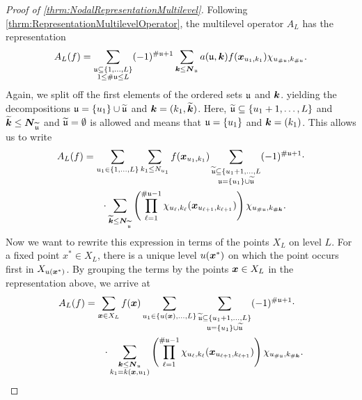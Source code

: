 \documentclass[	a4paper, 
								11pt]{article}
\theoremstyle{plain}
\begin{document}
\begin{proof}[Proof of \cref{thrm:NodalRepresentationMultilevel}]
Following \cref{thrm:RepresentationMultilevelOperator}, the multilevel operator $A_L$ has the representation
\begin{align*}
A_L(f) = \sum_{\substack{\mathfrak{u} \subseteq \{1, \dots, L \} \\ 1 \leq \# \mathfrak{u} \leq L}} (-1)^{\# \mathfrak{u} + 1} \sum_{\boldsymbol{k} \leq \boldsymbol{N}_{\mathfrak{u}}} a(\mathfrak{u}, \boldsymbol{k}) f(\boldsymbol{x}_{u_1,k_1}) \chi_{u_{\# \mathfrak{u}}, k_{\# \mathfrak{u}}}.
\end{align*}
Again, we split off the first elements of the ordered sets $ \mathfrak{u} $ and $ \boldsymbol{k} $. yielding the decompositions $ \mathfrak{u} = \{ u_1 \} \cup \widetilde{\mathfrak{u}} $ and $ \boldsymbol{k} = (k_1, \widetilde{\boldsymbol{k}} ) $. Here, $ \widetilde{\mathfrak{u}} \subseteq \{ u_1 + 1, \dots, L \} $ and $ \widetilde{\boldsymbol{k}} \leq \boldsymbol{N}_{\widetilde{\mathfrak{u}}} $ and $ \widetilde{\mathfrak{u}} = \emptyset $ is allowed and means that $ \mathfrak{u} = \{ u_1 \} $ and $ \boldsymbol{k} = (k_1) $. This allows us to write
\begin{align*}
    A_L(f) &= \sum_{u_1 \in \{ 1, \dots, L\}} \sum_{k_1 \leq N_{u_1}} f(\boldsymbol{x}_{u_1,k_1}) \sum_{\substack{\widetilde{\mathfrak{u}} \subseteq \{ u_1 + 1, \dots, L \\ \mathfrak{u} = \{ u_1 \} \cup \widetilde{\mathfrak{u}} }} (-1)^{\# \mathfrak{u} + 1} \cdot \\
    &\phantom{3em} \cdot \sum_{\widetilde{\boldsymbol{k}} \leq \boldsymbol{N}_{\widetilde{\mathfrak{u}}}} \left( \prod_{\ell=1}^{\# \mathfrak{u} - 1} \chi_{u_{\ell},k_{\ell}} ( \boldsymbol{x}_{u_{\ell + 1},k_{\ell+1}} ) \right) \chi_{u_{\# \mathfrak{u}}, k_{\# \boldsymbol{k}}}.
\end{align*}
Now we want to rewrite this expression in terms of the points $X_L $ on level $ L $. For a fixed point $ x^* \in X_L $, there is a unique level $ u(\boldsymbol{x}^*) $ on which the point occurs first in $ X_{u(\boldsymbol{x}^*)} $. By grouping the terms by the points $ \boldsymbol{x} \in X_L $ in the representation above, we arrive at
\begin{align*}
    A_L(f) &= \sum_{\boldsymbol{x} \in X_L} f(\boldsymbol{x}) \sum_{u_1 \in \{u(\boldsymbol{x}), \dots, L \}} \sum_{\substack{\widetilde{\mathfrak{u}} \subseteq \{u_1 + 1, \dots, L\} \\ \mathfrak{u} = \{u_1\} \cup \widetilde{\mathfrak{u}}}} (-1)^{\# \mathfrak{u} + 1} \cdot \\
    &\phantom{3em} \cdot \sum_{\substack{\boldsymbol{k} \leq \boldsymbol{N}_{\mathfrak{u}} \\ k_1 = k(\boldsymbol{x},u_1)}} \left( \prod_{\ell=1}^{\# \mathfrak{u} - 1} \chi_{u_{\ell},k_{\ell}} ( \boldsymbol{x}_{u_{\ell + 1},k_{\ell+1}} ) \right) \chi_{u_{\# \mathfrak{u}}, k_{\# \boldsymbol{k}}}.
\end{align*}

\end{proof}
\end{document}
